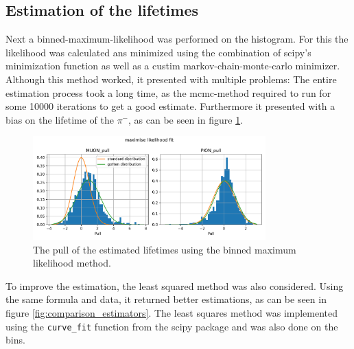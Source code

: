 \documentclass[11pt, a4paper, oneside]{book}
\newcommand\Plotwidth{0.8}
\newcommand{\pion}{$\pi^{-}$}
\begin{document}
\subsection{Estimation of the lifetimes}
Next a binned-maximum-likelihood was performed on the histogram. For this the likelihood was calculated ans minimized using the combination of scipy's minimization function as well as a custim markov-chain-monte-carlo minimizer. Although this method worked, it presented with multiple problems: The entire estimation process took a long time, as the mcmc-method required to run for some \num{10000} iterations to get a good estimate. Furthermore it presented with a bias on the lifetime of the \pion, as can be seen in figure \ref{fig:pull_likelihood_method}. 

\begin{figure}[H]
    \centering
    \includegraphics[width=\Plotwidth\textwidth]{images/estimators_pull_likelihood.pdf}
    \caption{The pull of the estimated lifetimes using the binned maximum likelihood method.}
    \label{fig:pull_likelihood_method}
\end{figure}

To improve the estimation, the least squared method was also considered. Using the same formula and data, it returned better estimations, as can be seen in figure \ref{fig:comparison_estimators}. The least squares method was implemented using the \lstinline|curve_fit| function from the scipy package and was also done on the bins. 


\end{document}
